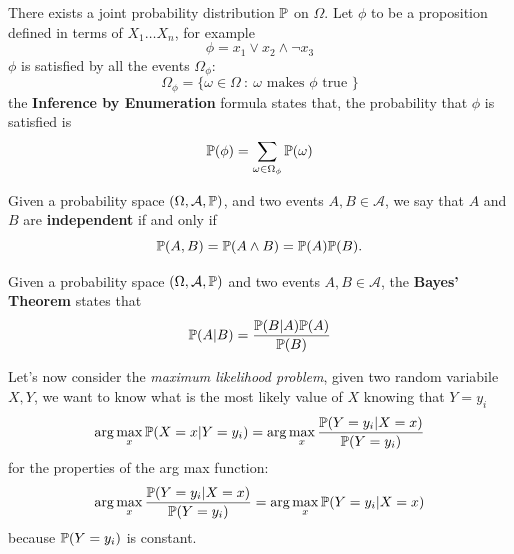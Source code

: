 \documentclass[10pt, letterpaper]{report}
\begin{document}
There exists a joint probability distribution ${\mathbb P}$ on $\Omega$. Let $\phi$ to be a proposition defined in terms of $X_1\dots X_n$, for example\begin{equation}
	\phi=x_1\lor x_2 \land \lnot x_3
\end{equation}
$\phi$ is satisfied by all the events $\Omega_\phi$:\begin{equation}
	\Omega_\phi=\{\omega\in \Omega \ : \ \omega \text{ makes } \phi \text{ true }\}
\end{equation}
the \textbf{Inference by Enumeration} formula states that, the probability that $\phi$ is satisfied is \begin{equation}
	{\mathbb P}(\phi)=\sum_{\omega\in  \Omega_\phi}{\mathbb P}(\omega)
\end{equation}
\begin{definition}
	Given a probability space $(\Omega,\mathcal A,{\mathbb P})$, and two events $A,B\in\mathcal A$, we say that $A$ and $B$ are \textbf{independent} if and only if\begin{equation}
		{\mathbb P}(A, B)={\mathbb P}(A\land B)={\mathbb P}(A){\mathbb P}(B).
	\end{equation}
\end{definition}
\begin{theorem}
	Given a probability space $(\Omega,\mathcal A,{\mathbb P})$ and two events $A,B\in\mathcal A$, the \textbf{Bayes' Theorem} states that\begin{equation}
		{\mathbb P}(A|B)=\frac{{\mathbb P}(B|A){\mathbb P}(A)}{{\mathbb P}(B)}
	\end{equation}
\end{theorem}
Let's now consider the \textit{maximum likelihood problem}, given two random variabile $X,Y$, we want to know what is the most likely value of $X$ knowing that $Y=y_i$\begin{equation}
	\arg\max_{x}{\mathbb P}(X=x|Y=y_i)=\arg\max_{x}\frac{{\mathbb P}(Y=y_i|X=x)}{{\mathbb P}(Y=y_i)}
\end{equation}
for the properties of the arg max function:\begin{equation}
	\arg\max_{x}\frac{{\mathbb P}(Y=y_i|X=x)}{{\mathbb P}(Y=y_i)}=\arg\max_{x}{{\mathbb P}(Y=y_i|X=x)}
\end{equation}
because ${\mathbb P}(Y=y_i)$ is constant.
\end{document}

